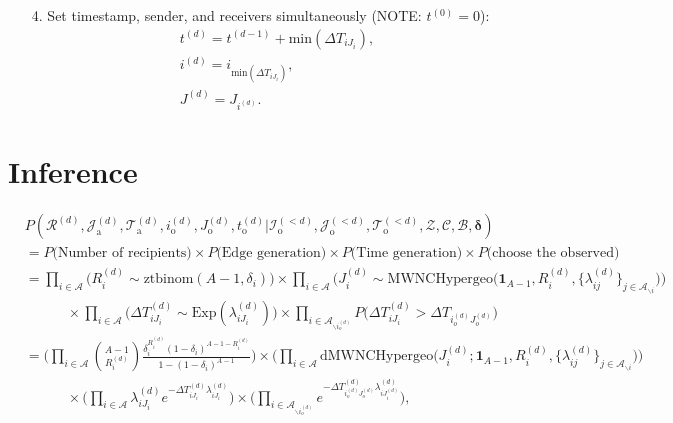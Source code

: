 \documentclass[a4paper]{article}
\begin{document}
\begin{itemize}
	 	 \item[4.] Set timestamp, sender, and receivers simultaneously (NOTE: $t^{(0)}=0$):
	 	 \begin{equation}
	 	 \begin{aligned}
	 	 &t^{(d)} = t^{(d-1)}+\mbox{min}(\Delta T_{i{J_i}}),\\
	 	  &i^{(d)} = i_{\mbox{min}(\Delta T_{i{J_i}})}, \\
	 	  &J^{(d)} = J_{i^{(d)}}.
	 	  \end{aligned}
	 	 \end{equation}
\end{itemize}
\section{Inference}
\begin{equation}
\begin{aligned}
&P(\mathcal{R}^{(d)},\mathcal{J}^{(d)}_{\mbox{a}}, \mathcal{T}^{(d)}_{\mbox{a}}, i^{(d)}_{\mbox{o}}, J^{(d)}_{\mbox{o}}, t^{(d)}_{\mbox{o}} |\mathcal{I}^{(<d)}_{\mbox{o}}, \mathcal{J}^{(<d)}_{\mbox{o}}, \mathcal{T}^{(<d)}_{\mbox{o}}, \mathcal{Z}, \mathcal{C}, \mathcal{B}, \boldsymbol{\delta})\\&=P\Big(\mbox{Number of recipients}\Big) \times P\Big(\mbox{Edge generation}\Big)\times P\Big(\mbox{Time generation}\Big) \times P\Big(\mbox{choose the observed}\Big) \\&
=\prod_{i\in \mathcal{A}} \Big(R_i^{(d)} \sim \mbox{ztbinom}(A-1, \delta_i)\Big)\times
\prod_{i\in \mathcal{A}}\Big(J_i^{(d)}\sim \mbox{MWNCHypergeo}\Big(\mathbf{1}_{A-1}, R_i^{(d)}, \{\lambda_{ij}^{(d)}\}_{j \in \mathcal{A}_{\backslash i}} \Big)\Big) \\&\quad\quad\quad\times \prod_{i\in \mathcal{A}}\Big(\Delta T^{(d)}_{iJ_i}\sim\mbox{Exp}(\lambda^{(d)}_{iJ_i})\Big) \times \prod_{i\in \mathcal{A}_{\backslash i_o^{(d)}}} P\Big(\Delta T^{(d)}_{i{J_i}} > \Delta T_{i_{o}^{(d)}{J_{o}^{(d)}}}\Big)\\&=\Big(\prod_{i\in \mathcal{A}} {{A-1}\choose R_i^{(d)}} \frac{\delta_i^{ R_i^{(d)}} (1-\delta_i)^{A-1-R_i^{(d)}}}{1 - (1-\delta_i)^{A-1}}\Big) \times \Big(\prod_{i\in \mathcal{A}}\mbox{dMWNCHypergeo}\Big(J_i^{(d)}; \mathbf{1}_{A-1}, R_i^{(d)}, \{\lambda_{ij}^{(d)}\}_{j \in \mathcal{A}_{\backslash i}}\Big)\Big)\\&\quad\quad\quad
\times \Big(\prod_{i \in\mathcal{A}}\lambda^{(d)}_{iJ_i}e^{-\Delta T^{(d)}_{iJ_i}\lambda^{(d)}_{iJ_i}}\Big)\times \Big( \prod_{i\in \mathcal{A}_{\backslash i_o^{(d)}}} e^{-\Delta T^{(d)}_{i_o^{(d)}J_o^{(d)}}\lambda^{(d)}_{iJ^{(d)}_{i}}}\Big),
\end{aligned}
\end{equation}
\end{document}
